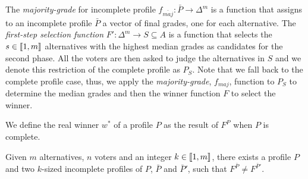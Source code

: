 \documentclass[version=3.21, pagesize, twoside=off, bibliography=totoc, DIV=calc, fontsize=12pt, a4paper]{scrartcl}
\begin{document}
The \emph{majority-grade} for incomplete profile $f_{\bar{maj}}: \bar{P} \rightarrow \Delta^m$ is a function that assigns to an incomplete profile $\bar{P}$ a vector of final grades, one for each alternative. The \emph{first-step selection function} $F':\Delta^{m} \rightarrow S \subseteq A$ is a function that selects the $s \in \llbracket1,m\rrbracket$ alternatives with the highest median grades as candidates for the second phase. All the voters are then asked to judge the alternatives in $S$ and we denote this restriction of the complete profile as $P_{S}$. Note that we fall back to the complete profile case, thus, we apply the \emph{majority-grade}, $f_{maj}$, function to $P_{S}$ to determine the median grades and then the winner function $F$ to select the winner.

\begin{definition}
	We define the real winner $w^*$ of a profile $P$ as the result of $F^P$ when $P$ is complete.
\end{definition}

\begin{proposition}
	\label{prop:notsamewinner}
	Given $m$ alternatives, $n$ voters and an integer $k \in \llbracket1,m\rrbracket$, there exists a profile $P$ and two $k$-sized incomplete profiles of $P$, $\bar{P}$ and $\bar{P}'$, such that $F^{\bar{P}} \neq F^{\bar{P}'}$.
\end{proposition}
\end{document}
